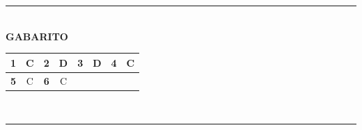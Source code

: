 \documentclass[11pt,a4paper]{article}
\begin{document}
\begin{center}
    \rule{0.6\textwidth}{0.5pt} \\[0.3cm]
    \textbf{\large GABARITO} \\[0.3cm]
    \begin{tabular}{|c|c|c|c|c|c|c|c|}
        \hline
        \textbf{1} & C & \textbf{2} & D & \textbf{3}            & D & \textbf{4} & C \\ \hline
        \textbf{5} & C & \textbf{6} & C & \multicolumn{4}{c|}{}                      \\ \hline
    \end{tabular} \\[0.3cm]
    \rule{0.6\textwidth}{0.5pt}
\end{center}
\end{document}
